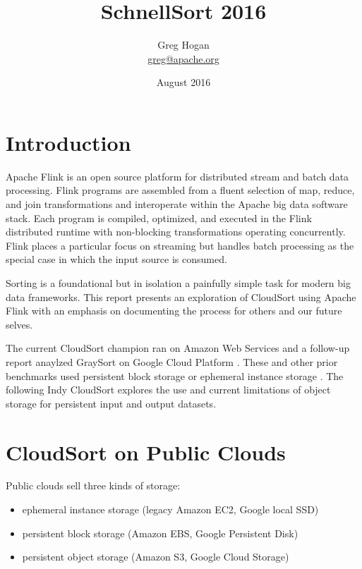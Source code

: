 \documentclass{article}
\title{SchnellSort 2016}
\author{Greg Hogan \\ \href{mailto:greg@apache.org}{greg@apache.org} }
\date{August 2016}
\begin{document}
\maketitle

\section{Introduction}
Apache Flink \cite{apacheflink} is an open source platform for distributed stream and batch data processing. Flink programs are assembled from a fluent selection of map, reduce, and join transformations and interoperate within the Apache big data software stack. Each program is compiled, optimized, and executed in the Flink distributed runtime with non-blocking transformations operating concurrently. Flink places a particular focus on streaming but handles batch processing as the special case in which the input source is consumed.

Sorting is a foundational but in isolation a painfully simple task for modern big data frameworks. This report presents an exploration of CloudSort \cite{cloudsort} using Apache Flink with an emphasis on documenting the process for others and our future selves.

The current CloudSort champion \cite{tritonsort2014} ran on Amazon Web Services \cite{amazonwebservices} and a follow-up report \cite{tritonsort2015} anaylzed GraySort on Google Cloud Platform \cite{googlecloudplatform}. These and other prior benchmarks used persistent block storage \cite{tritonsort2014} or ephemeral instance storage \cite{tritonsort2015} \cite{apachespark2014}. The following Indy CloudSort explores the use and current limitations of object storage for persistent input and output datasets.

\section{CloudSort on Public Clouds}
Public clouds sell three kinds of storage:
\begin{itemize}  
\item ephemeral instance storage (legacy Amazon EC2, Google local SSD)
\item persistent block storage (Amazon EBS, Google Persistent Disk)
\item persistent object storage (Amazon S3, Google Cloud Storage)
\end{itemize}
\end{document}
